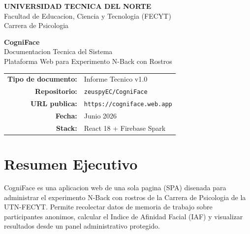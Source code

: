 \documentclass[12pt,a4paper]{article}
\begin{document}
\begin{titlepage}

\vspace*{2.5cm}
\begin{center}
  {\LARGE\bfseries\textcolor{primary}{UNIVERSIDAD TECNICA DEL NORTE}}\\[0.4cm]
  {\large Facultad de Educacion, Ciencia y Tecnologia (FECYT)}\\[0.2cm]
  {\large Carrera de Psicologia}\\[2cm]

  \begin{tcolorbox}[infobox, width=0.92\textwidth]
    \centering
    {\Huge\bfseries\textcolor{primary}{CogniFace}}\\[0.5cm]
    {\LARGE Documentacion Tecnica del Sistema}\\[0.3cm]
    {\large Plataforma Web para Experimento N-Back con Rostros}
  \end{tcolorbox}

  \vspace{2cm}
  \begin{tabular}{rl}
    \textbf{Tipo de documento:} & Informe Tecnico v1.0 \\[0.3cm]
    \textbf{Repositorio:}       & \texttt{zeuspyEC/CogniFace} \\[0.3cm]
    \textbf{URL publica:}       & \texttt{https://cogniface.web.app} \\[0.3cm]
    \textbf{Fecha:}             & Junio 2026 \\[0.3cm]
    \textbf{Stack:}             & React 18 + Firebase Spark
  \end{tabular}
\end{center}
\end{titlepage}

\tableofcontents
\newpage

\section{Resumen Ejecutivo}

CogniFace es una aplicacion web de una sola pagina (SPA) disenada para administrar
el experimento N-Back con rostros de la Carrera de Psicologia de la UTN-FECYT.
Permite recolectar datos de memoria de trabajo sobre participantes anonimos,
calcular el Indice de Afinidad Facial (IAF) y visualizar resultados desde
un panel administrativo protegido.
\end{document}
